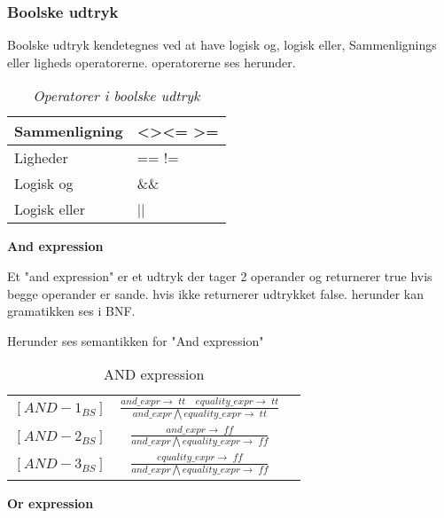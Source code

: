 \subsubsection{Boolske udtryk}
Boolske udtryk kendetegnes ved at have logisk og, logisk eller, Sammenlignings eller ligheds operatorerne. operatorerne ses herunder.

\begin{table}[H]
    \centering
    \begin{tabular}{|l|l|}
        \hline
        \centering

        Sammenligning      & \textless \quad \textgreater \quad \textless= \quad\textgreater= \\ \hline
        Ligheder           & == \quad !=                                                      \\ \hline
        Logisk og          & \&\&                                                              \\ \hline
        Logisk eller       & ||                                                               \\ \hline


    \end{tabular}
    \caption{\textit{Operatorer i boolske udtryk}}
    \label{tab:operatorerboolsk}
\end{table}
\noindent\textbf{And expression}

\noindent Et "and expression" er et udtryk der tager 2 operander og returnerer true hvis begge operander er sande. hvis ikke returnerer udtrykket false.
herunder kan gramatikken ses i BNF.

\noindent Herunder ses semantikken for "And expression"

    \bgroup
    \def\arraystretch{3}
    \begin{table}[H]
    \centering
    \begin{tabular}{l c l}
        
        $[AND-1_{BS}]$ &$\frac{and\_expr \rightarrow \; tt \quad equality\_expr \rightarrow \; tt}{and\_expr \bigwedge equality\_expr \rightarrow \; tt}$ & \\
    
        $[AND-2_{BS}]$ &$\frac{and\_expr \rightarrow \; ff}{and\_expr \bigwedge equality\_expr \rightarrow \; ff}$ & \\
        
        $[AND-3_{BS}]$ &$\frac{equality\_expr \rightarrow \; ff}{and\_expr \bigwedge equality\_expr \rightarrow \; ff}$ & \\
        
    \end{tabular}
    \caption{AND expression}
    \label{tab:andexpr}
    \end{table}
    \egroup
\noindent\textbf{Or expression}

